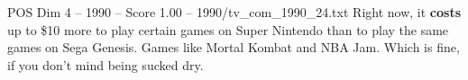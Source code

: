 \begin{textsample}{POS Dim 4 – 1990 – Score 1.00 – 1990/tv\_com\_1990\_24.txt}  \label{ex:f4_pos_028}
Right now, it \textbf{costs} up to \$10 more to play certain games on Super Nintendo than to play the same games on Sega Genesis.
Games like Mortal Kombat and NBA Jam.
Which is fine, if you don't mind being sucked dry.

\end{textsample}
